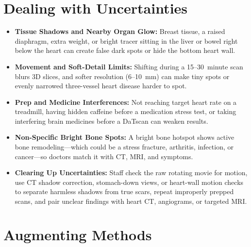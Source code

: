 \section{Dealing with Uncertainties}

\begin{itemize}
    \item \textbf{Tissue Shadows and Nearby Organ Glow:} Breast tissue, a raised diaphragm, extra weight, or bright tracer sitting in the liver or bowel right below the heart can create false dark spots or hide the bottom heart wall.
    \item \textbf{Movement and Soft-Detail Limits:} Shifting during a 15--30~minute scan blurs 3D slices, and softer resolution (6--10~mm) can make tiny spots or evenly narrowed three-vessel heart disease harder to spot.
    \item \textbf{Prep and Medicine Interferences:} Not reaching target heart rate on a treadmill, having hidden caffeine before a medication stress test, or taking interfering brain medicines before a DaTscan can weaken results.
    \item \textbf{Non-Specific Bright Bone Spots:} A bright bone hotspot shows active bone remodeling---which could be a stress fracture, arthritis, infection, or cancer---so doctors match it with CT, MRI, and symptoms.
    \item \textbf{Clearing Up Uncertainties:} Staff check the raw rotating movie for motion, use CT shadow correction, stomach-down views, or heart-wall motion checks to separate harmless shadows from true scars, repeat improperly prepped scans, and pair unclear findings with heart CT, angiograms, or targeted MRI.
\end{itemize}

\section{Augmenting Methods}

